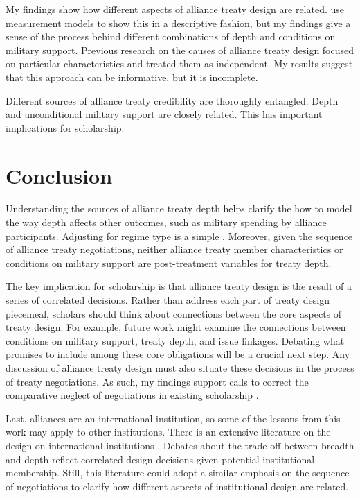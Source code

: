 \documentclass[12pt]{article}
\begin{document}
My findings show how different aspects of alliance treaty design are related. 
\citet{BensonClinton2016} use measurement models to show this in a descriptive fashion, but my findings give a sense of the process behind different combinations of depth and conditions on military support. 
Previous research on the causes of alliance treaty design \citep{Benson2012, Mattes2012, Chibaetal2015} focused on particular characteristics and treated them as independent. 
My results suggest that this approach can be informative, but it is incomplete. 


Different sources of alliance treaty credibility are thoroughly entangled. 
Depth and unconditional military support are closely related. 
This has important implications for scholarship. 


\section{Conclusion}


Understanding the sources of alliance treaty depth helps clarify the how to model the way depth affects other outcomes, such as military spending by alliance participants. 
Adjusting for regime type is a simple . 
Moreover, given the sequence of alliance treaty negotiations, neither alliance treaty member characteristics or conditions on military support are post-treatment variables for treaty depth. 


The key implication for scholarship is that alliance treaty design is the result of a series of correlated decisions. 
Rather than address each part of treaty design piecemeal, scholars should think about connections between the core aspects of treaty design. 
For example, future work might examine the connections between conditions on military support, treaty depth, and issue linkages.  
Debating what promises to include among these core obligations will be a crucial next step. 
Any discussion of alliance treaty design must also situate these decisions in the process of treaty negotiations.
As such, my findings support calls to correct the comparative neglect of negotiations in existing scholarship \citep{Poast2019a}. 


Last, alliances are an international institution, so some of the lessons from this work may apply to other institutions. 
There is an extensive literature on the design on international institutions \citep{DownesRocke1995, MartinSimmons1998, Koremenosetal2001, Koremenos2005, Thompson2010}.
Debates about the trade off between breadth and depth \citep{Downsetal1998, Gilligan2004} reflect correlated design decisions given potential institutional membership. 
Still, this literature could adopt a similar emphasis on the sequence of negotiations to clarify how different aspects of institutional design are related. 
\end{document}
